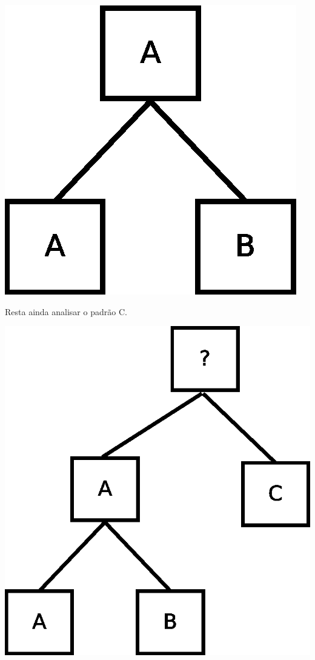 \begin{center}
	\includegraphics[scale=0.4]{graficos/arvore_nivel2}
	\label{img:Arv_nivel2}
\end{center}

Resta ainda analisar o padrão C.

\begin{center}
	\includegraphics[scale=0.4]{graficos/arvore_nivel3}
	\label{img:Arv_nivel3}
\end{center}

